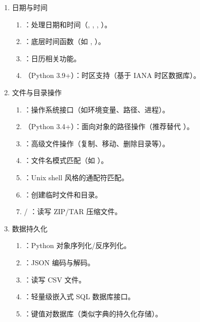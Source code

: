 \begin{enumerate}[label=\arabic*)]
    \item 日期与时间
    \begin{enumerate}[itemindent=1em,label=(\arabic*)]
        \item {}：处理日期和时间（, , , ）。
        \item {}：底层时间函数（如 , ）。
        \item {}：日历相关功能。
        \item {}（Python 3.9+）：时区支持（基于 IANA 时区数据库）。
    \end{enumerate}

    \item 文件与目录操作
    \begin{enumerate}[itemindent=1em,label=(\arabic*)]
        \item {}：操作系统接口（如环境变量、路径、进程）。
        \item {}（Python 3.4+）：面向对象的路径操作（推荐替代 ）。
        \item {}：高级文件操作（复制、移动、删除目录等）。
        \item {}：文件名模式匹配（如 ）。
        \item {}：Unix shell 风格的通配符匹配。
        \item {}：创建临时文件和目录。
        \item {} / ：读写 ZIP/TAR 压缩文件。
    \end{enumerate}

    \item 数据持久化
    \begin{enumerate}[itemindent=1em,label=(\arabic*)]
        \item {}：Python 对象序列化/反序列化。
        \item {}：JSON 编码与解码。
        \item {}：读写 CSV 文件。
        \item {}：轻量级嵌入式 SQL 数据库接口。
        \item {}：键值对数据库（类似字典的持久化存储）。
    \end{enumerate}


\end{enumerate}
